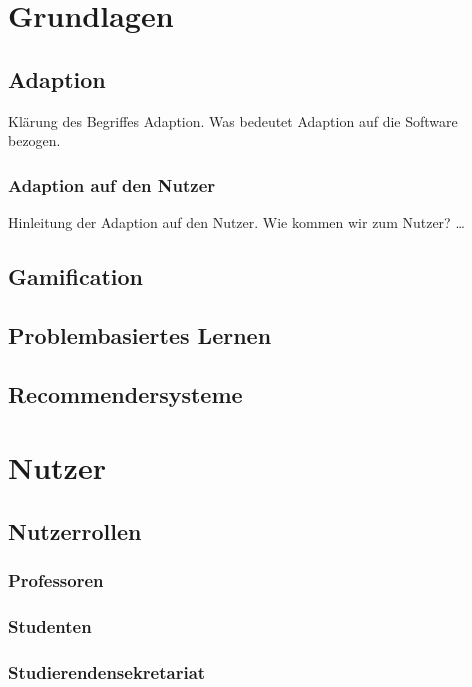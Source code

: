 
\chapter{Grundlagen}
\label{ch:Content1}

\section{Adaption}
Klärung des Begriffes Adaption. Was bedeutet Adaption auf die Software bezogen.


\subsection{Adaption auf den Nutzer}
\label{ch:Content1:sec:Section1}
Hinleitung der Adaption auf den Nutzer. Wie kommen wir zum Nutzer?
\dots

\section{Gamification}

\section{Problembasiertes Lernen}

\section{Recommendersysteme}


\chapter{Nutzer}

\section{Nutzerrollen}
\subsection{Professoren}
\subsection{Studenten}
\subsection{Studierendensekretariat}
